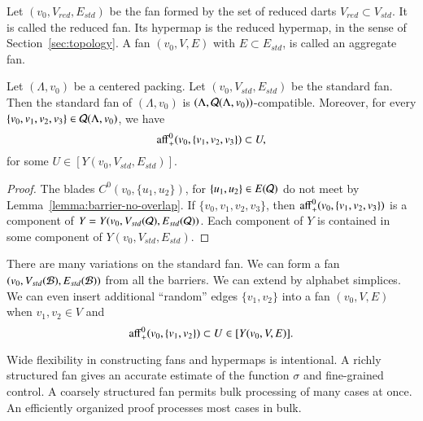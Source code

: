 \begin{definition}  Let $(v_0,V_{red},E_{std})$
be the fan formed by the set of reduced darts $V_{red}\subset V_{std}$.
It is called the reduced fan. Its hypermap is the reduced hypermap,
in the sense of Section~\ref{sec:topology}.  A fan   $(v_0,V,E)$ with
$E\subset E_{std}$, is called an aggregate fan.
\end{definition}

\begin{lemma}
Let $(\Lambda,v_0)$ be a centered packing.  Let $(v_0,V_{std},E_{std})$ be the
standard fan.  Then the standard fan of $(\Lambda,v_0)$ is
$(\Lambda,{\mathcal Q}(\Lambda,v_0))$-compatible. Moreover,
for every $\{v_0,v_1,v_2,v_3\}\in{\mathcal Q}(\Lambda,v_0)$, we have
$$
 {\operatorname{aff}}_+^0(v_0,\{v_1,v_2,v_3\})\subset U,
$$
for some $U\in[Y(v_0,V_{std},E_{std})]$.
\end{lemma}


\begin{proof}  
The blades $C^0(v_0,\{u_1,u_2\})$, for $\{u_1,u_2\}\in E({\mathcal Q})$
do not meet by Lemma~\ref{lemma:barrier-no-overlap}.
If $\{v_0,v_1,v_2,v_3\}$, then ${\operatorname{aff}}_+^0(v_0,\{v_1,v_2,v_3\})$
is a component of $Y=Y(v_0,V_{std}({\mathcal Q}),E_{std}({\mathcal Q}))$.  Each component
of $Y$ is contained in some component of $Y(v_0,V_{std},E_{std})$.
\end{proof}

There are many variations on the standard fan.  
We can form a fan $(v_0,V_{std}({\mathcal B}),E_{std}({\mathcal B}))$ from all
the barriers.  We can extend by
alphabet simplices.  We can even insert additional ``random''
edges $\{v_1,v_2\}$ into a fan $(v_0,V,E)$ when $v_1,v_2\in V$ and
$${\operatorname{aff}}_+^0(v_0,\{v_1,v_2\})\subset U\in [Y(v_0,V,E)].$$

Wide flexibility in constructing fans and hypermaps
is intentional.  A richly structured fan
gives an accurate estimate of the function $\sigma$ and fine-grained
control. 
A coarsely structured fan permits bulk processing of many cases
at once.  An efficiently organized proof processes most cases in bulk.




